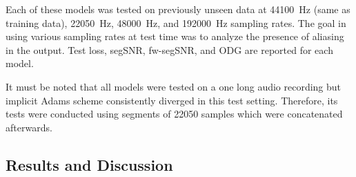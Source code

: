 Each of these models was tested on previously unseen data at \SI{44100}{Hz} (same as training data), \SI{22050}{Hz}, \SI{48000}{Hz}, and \SI{192000}{Hz} sampling rates. The goal in using various sampling rates at test time was to analyze the presence of aliasing in the output. Test loss, \ac{segSNR}, \ac{fw-segSNR}, and \ac{ODG} are reported for each model. 

It must be noted that all models were tested on a one long audio recording but implicit Adams scheme consistently diverged in this test setting. Therefore, its tests were conducted using segments of 22050 samples which were concatenated afterwards.

\subsection{Results and Discussion}
\label{sec:diode_clipper_results}



\begin{table}[]
    
    \label{tab:diode_clipper_results_esr}
\end{table}
    